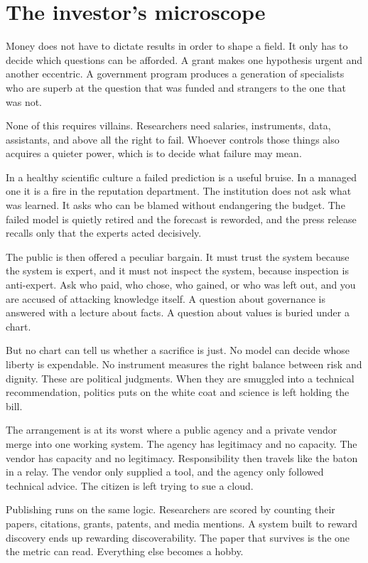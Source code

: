 \documentclass[12pt,a4paper]{book}
\begin{document}
\section{The investor's microscope}

Money does not have to dictate results in order to shape a field. It only has to decide which questions can be afforded. A grant makes one hypothesis urgent and another eccentric. A government program produces a generation of specialists who are superb at the question that was funded and strangers to the one that was not.

None of this requires villains. Researchers need salaries, instruments, data, assistants, and above all the right to fail. Whoever controls those things also acquires a quieter power, which is to decide what failure may mean.

In a healthy scientific culture a failed prediction is a useful bruise. In a managed one it is a fire in the reputation department. The institution does not ask what was learned. It asks who can be blamed without endangering the budget. The failed model is quietly retired and the forecast is reworded, and the press release recalls only that the experts acted decisively.

The public is then offered a peculiar bargain. It must trust the system because the system is expert, and it must not inspect the system, because inspection is anti-expert. Ask who paid, who chose, who gained, or who was left out, and you are accused of attacking knowledge itself. A question about governance is answered with a lecture about facts. A question about values is buried under a chart.

But no chart can tell us whether a sacrifice is just. No model can decide whose liberty is expendable. No instrument measures the right balance between risk and dignity. These are political judgments. When they are smuggled into a technical recommendation, politics puts on the white coat and science is left holding the bill.

The arrangement is at its worst where a public agency and a private vendor merge into one working system. The agency has legitimacy and no capacity. The vendor has capacity and no legitimacy. Responsibility then travels like the baton in a relay. The vendor only supplied a tool, and the agency only followed technical advice. The citizen is left trying to sue a cloud.

Publishing runs on the same logic. Researchers are scored by counting their papers, citations, grants, patents, and media mentions. A system built to reward discovery ends up rewarding discoverability. The paper that survives is the one the metric can read. Everything else becomes a hobby.
\end{document}
